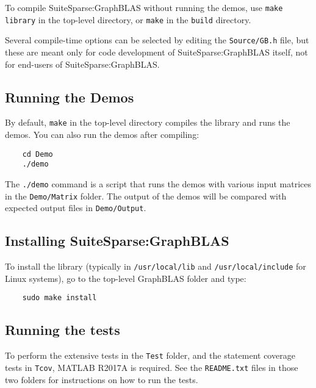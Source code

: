 \documentclass[12pt]{article}
\begin{document}
To compile SuiteSparse:GraphBLAS without running the demos, use
\verb'make library' in the top-level directory, or \verb'make' in the
\verb'build' directory.

Several compile-time options can be selected by editing the \verb'Source/GB.h'
file, but these are meant only for code development of SuiteSparse:GraphBLAS
itself, not for end-users of SuiteSparse:GraphBLAS.

\subsection{Running the Demos}

By default, \verb'make' in the top-level directory compiles the library
and runs the demos.  You can also run the demos after compiling:

    {\small
    \begin{verbatim}
    cd Demo
    ./demo \end{verbatim} }

The \verb'./demo' command is a script that runs the demos with various input
matrices in the \verb'Demo/Matrix' folder.  The output of the demos will be
compared with expected output files in \verb'Demo/Output'.

\subsection{Installing SuiteSparse:GraphBLAS}

To install the library (typically in \verb'/usr/local/lib' and
\verb'/usr/local/include' for Linux systems), go to the top-level GraphBLAS
folder and type:

    {\small
    \begin{verbatim}
    sudo make install \end{verbatim} }

\subsection{Running the tests}

To perform the extensive tests in the \verb'Test' folder, and the statement
coverage tests in \verb'Tcov', MATLAB R2017A is required.  See the
\verb'README.txt' files in those two folders for instructions on how to run the
tests.
\end{document}
